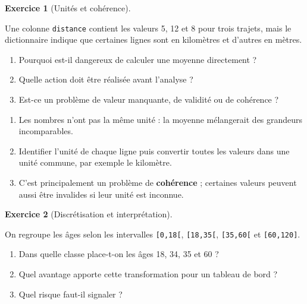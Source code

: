 \documentclass[
  french,
  letterpaper,
  open=any]{scrbook}
\providecommand{\tightlist}{%
  \setlength{\itemsep}{0pt}\setlength{\parskip}{0pt}}
\theoremstyle{definition}
\theoremstyle{definition}
\newtheorem{exercise}{Exercice}[section]
\theoremstyle{remark}
\begin{document}
\begin{exercise}[Unités et
cohérence]\protect\hypertarget{exr-prep-7}{}\label{exr-prep-7}

Une colonne \texttt{distance} contient les valeurs 5, 12 et 8 pour trois
trajets, mais le dictionnaire indique que certaines lignes sont en
kilomètres et d'autres en mètres.

\begin{enumerate}
\def\labelenumi{\alph{enumi}.}
\tightlist
\item
  Pourquoi est-il dangereux de calculer une moyenne directement ?
\item
  Quelle action doit être réalisée avant l'analyse ?
\item
  Est-ce un problème de valeur manquante, de validité ou de cohérence ?
\end{enumerate}

\end{exercise}

\begin{tcolorbox}[enhanced jigsaw, arc=.35mm, bottomrule=.15mm, bottomtitle=1mm, breakable, colback=white, colbacktitle=quarto-callout-tip-color!10!white, colframe=quarto-callout-tip-color-frame, coltitle=black, left=2mm, leftrule=.75mm, opacityback=0, opacitybacktitle=0.6, rightrule=.15mm, title=\textcolor{quarto-callout-tip-color}{\faLightbulb}\hspace{0.5em}{Solution de l'exercice Exercice~\ref{exr-prep-7}}, titlerule=0mm, toprule=.15mm, toptitle=1mm]

\begin{enumerate}
\def\labelenumi{\alph{enumi}.}
\tightlist
\item
  Les nombres n'ont pas la même unité : la moyenne mélangerait des
  grandeurs incomparables.
\item
  Identifier l'unité de chaque ligne puis convertir toutes les valeurs
  dans une unité commune, par exemple le kilomètre.
\item
  C'est principalement un problème de \textbf{cohérence} ; certaines
  valeurs peuvent aussi être invalides si leur unité est inconnue.
\end{enumerate}

\end{tcolorbox}

\begin{exercise}[Discrétisation et
interprétation]\protect\hypertarget{exr-prep-8}{}\label{exr-prep-8}

On regroupe les âges selon les intervalles \texttt{{[}0,18{[}},
\texttt{{[}18,35{[}}, \texttt{{[}35,60{[}} et \texttt{{[}60,120{]}}.

\begin{enumerate}
\def\labelenumi{\alph{enumi}.}
\tightlist
\item
  Dans quelle classe place-t-on les âges 18, 34, 35 et 60 ?
\item
  Quel avantage apporte cette transformation pour un tableau de bord ?
\item
  Quel risque faut-il signaler ?
\end{enumerate}

\end{exercise}
\end{document}
